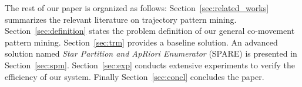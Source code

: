 The rest of our paper is organized as follows: Section~\ref{sec:related_works} summarizes the relevant literature on 
trajectory pattern mining. Section~\ref{sec:definition} states the problem definition of our general co-movement pattern mining. Section~\ref{sec:trm} provides a baseline solution. An advanced solution named
\emph{Star Partition and ApRiori Enumerator} (SPARE) is presented in Section~\ref{sec:spm}. Section~\ref{sec:exp} conducts extensive experiments to verify the efficiency of our system. Finally Section~\ref{sec:concl} concludes the paper.
